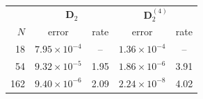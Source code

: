 \begin{tabular}{r cc cc}
\toprule
& \multicolumn{2}{c}{$\mathbf D_2$} & \multicolumn{2}{c}{$\mathbf D_2^{(4)}$}\\
$N$ & error & rate & error & rate\\
\midrule
18 & $7.95{\times}10^{-4}$ & -- & $1.36{\times}10^{-4}$ & --\\
54 & $9.32{\times}10^{-5}$ & 1.95 & $1.86{\times}10^{-6}$ & 3.91\\
162 & $9.40{\times}10^{-6}$ & 2.09 & $2.24{\times}10^{-8}$ & 4.02\\
\bottomrule
\end{tabular}
